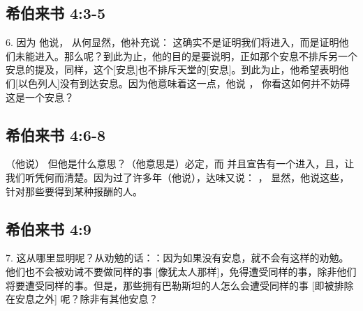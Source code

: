 \subsection{希伯来书 4:3-5}

6.  因为 他说， 从何显然，他补充说： 这确实不是证明我们将进入，而是证明他们未能进入。那么呢？到此为止，他的目的是要说明，正如那个安息不排斥另一个安息的提及，同样，这个[安息]也不排斥天堂的[安息]。到此为止，他希望表明他们[以色列人]没有到达安息。因为他意味着这一点，他说 ， 你看这如何并不妨碍这是一个安息？\par


\subsection{希伯来书 4:6-8}

（他说） 但他是什么意思？（他意思是）必定，而 并且宣告有一个进入，且，让我们听凭何而清楚。因为过了许多年（他说），达味又说： ， 显然，他说这些，针对那些要得到某种报酬的人。\par


\subsection{希伯来书 4:9}

7.  这从哪里显明呢？从劝勉的话：：因为如果没有安息，就不会有这样的劝勉。他们也不会被劝诫不要做同样的事 [像犹太人那样]，免得遭受同样的事，除非他们将要遭受同样的事。但是，那些拥有巴勒斯坦的人怎么会遭受同样的事 [即被排除在安息之外] 呢？除非有其他安息？\par

